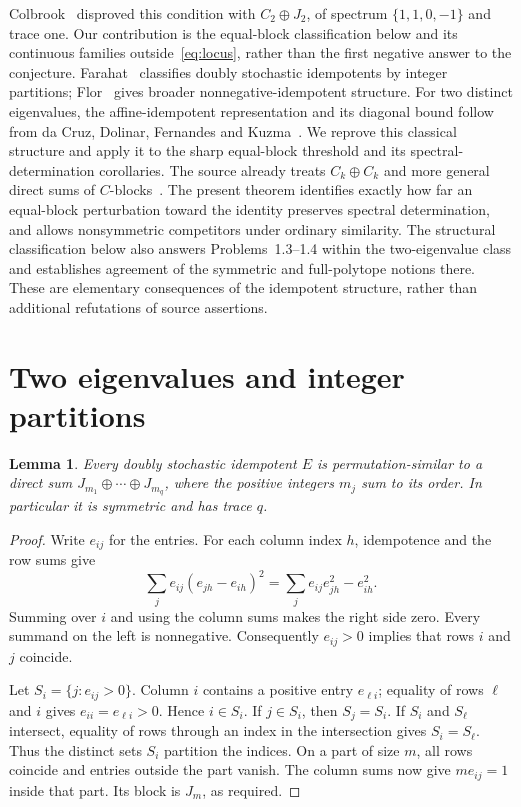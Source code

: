 \documentclass[11pt]{article}
\newtheorem{lemma}[theorem]{Lemma}
\begin{document}
Colbrook~\cite[Theorem IS-02, Sections 1--2]{Colbrook} disproved this condition with $C_2\oplus J_2$, of spectrum $\{1,1,0,-1\}$ and trace one.
Our contribution is the equal-block classification below and its continuous families outside~\eqref{eq:locus}, rather than the first negative answer to the conjecture.
Farahat~\cite[Section 2, assertion (2.2) and the following paragraph, pp.~178--179]{Farahat} classifies doubly stochastic idempotents by integer partitions; Flor~\cite[Theorem 2]{Flor} gives broader nonnegative-idempotent structure.
For two distinct eigenvalues, the affine-idempotent representation and its diagonal bound follow from da Cruz, Dolinar, Fernandes and Kuzma~\cite[Proposition 1.2, Theorem 2.1 and Remark 2.2, pp.~389--391]{Centralizers}.
We reprove this classical structure and apply it to the sharp equal-block threshold and its spectral-determination corollaries.
The source already treats $C_k\oplus C_k$ and more general direct sums of $C$-blocks~\cite[Theorem 2.12 and Corollary 2.13]{MA}.
The present theorem identifies exactly how far an equal-block perturbation toward the identity preserves spectral determination, and allows nonsymmetric competitors under ordinary similarity.
The structural classification below also answers Problems~1.3--1.4 within the two-eigenvalue class and establishes agreement of the symmetric and full-polytope notions there. These are elementary consequences of the idempotent structure, rather than additional refutations of source assertions.

\section{Two eigenvalues and integer partitions}
\begin{lemma}\label{lem:projection}
Every doubly stochastic idempotent $E$ is permutation-similar to a direct sum $J_{m_1}\oplus\cdots\oplus J_{m_q}$, where the positive integers $m_j$ sum to its order. In particular it is symmetric and has trace $q$.
\end{lemma}
\begin{proof}
Write $e_{ij}$ for the entries. For each column index $h$, idempotence and the row sums give
\[
 \sum_j e_{ij}(e_{jh}-e_{ih})^2
   =\sum_j e_{ij}e_{jh}^2-e_{ih}^2.
\]
Summing over $i$ and using the column sums makes the right side zero. Every summand on the left is nonnegative. Consequently $e_{ij}>0$ implies that rows $i$ and $j$ coincide.

Let $S_i=\{j:e_{ij}>0\}$. Column $i$ contains a positive entry $e_{\ell i}$; equality of rows $\ell$ and $i$ gives $e_{ii}=e_{\ell i}>0$. Hence $i\in S_i$.
If $j\in S_i$, then $S_j=S_i$. If $S_i$ and $S_\ell$ intersect, equality of rows through an index in the intersection gives $S_i=S_\ell$.
Thus the distinct sets $S_i$ partition the indices. On a part of size $m$, all rows coincide and entries outside the part vanish. The column sums now give $m e_{ij}=1$ inside that part. Its block is $J_m$, as required.
\end{proof}
\end{document}
